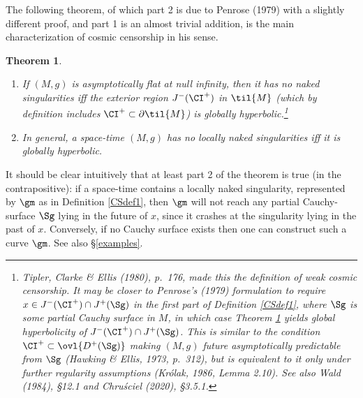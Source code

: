 \documentclass[12pt]{article}
\newcommand{\p}{\partial}
\newtheorem{theorem}{Theorem}[section]
\begin{document}
The following theorem, of which part 2 is due to Penrose (1979) with a slightly different proof, and part 1 is an almost trivial addition, is the main characterization of cosmic censorship in his sense.  
 \begin{theorem}\label{P79theorem} 
\begin{enumerate}
\item  If $(M,g)$ is asymptotically flat at null infinity, then it has no  naked singularities iff the exterior region  $J^-(\CI^+)$ in $\til{M}$ (which by definition includes $\CI^+\subset\p\til{M}$)
is globally hyperbolic.\footnote{Tipler, Clarke \& Ellis (1980), p.\ 176,  made this the
\emph{definition} of weak cosmic censorship. It may be closer to Penrose's (1979) formulation to require 
$x\in J^-(\CI^+)\cap J^+(\Sg)$ in the first part of Definition \ref{CSdef1}, where $\Sg$ is some partial Cauchy surface in $M$,
in which case Theorem \ref{P79theorem} yields global hyperbolicity of $J^-(\CI^+)\cap J^+(\Sg)$. This is similar to the condition  $\CI^+\subset\ovl{D^+(\Sg)}$ making
 $(M,g)$  \emph{future asymptotically predictable} from $\Sg$ (Hawking \& Ellis, 1973, p.\ 312), but is equivalent to it only under further regularity assumptions (Kr\'{o}lak, 1986, Lemma 2.10). See also Wald (1984), \S 12.1 and Chru\'{s}ciel (2020), \S 3.5.1.
  }
\item In general, a space-time $(M,g)$ has no locally naked singularities iff it is globally hyperbolic.
\end{enumerate}
\end{theorem}
It should be clear intuitively that at least part 2 of the theorem is true (in the contrapositive): if a space-time contains a locally naked singularity, represented by $\gm$ as in Definition \ref{CSdef1}, then $\gm$ will not reach any partial Cauchy-surface $\Sg$ lying in the future of $x$, since it crashes at the singularity lying in the past of $x$. Conversely, if no Cauchy surface exists then one can construct such a curve $\gm$. See also \S\ref{examples}.  \smallskip
\end{document}
